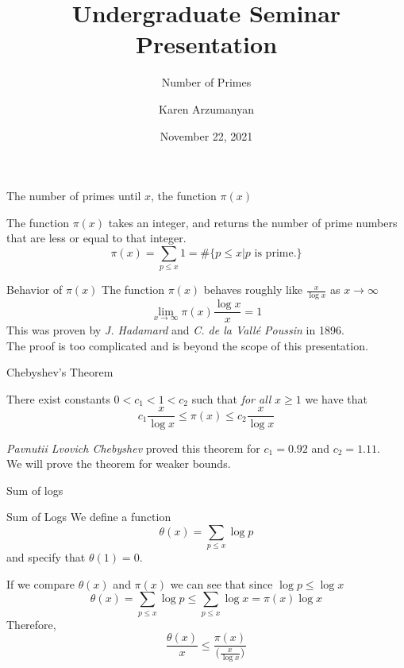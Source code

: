\documentclass[18pt]{beamer}
\title{Undergraduate Seminar Presentation}
\subtitle{Number of Primes}
\author{Karen Arzumanyan}
\date{November 22, 2021}
\begin{document}

\begin{frame}
    \maketitle
\end{frame}

\begin{frame}{The number of primes until $x$, the function $\pi(x)$}
    \begin{definition}
        The function $\pi(x)$ takes an integer, and returns the number of prime numbers that are less or equal to that integer.
        \pause{}
        \[\pi(x) = \sum\limits_{p \leq x} 1 = \#\{p \leq  x | p \text{ is prime.}\}\]
    \end{definition}
\end{frame}

\begin{frame}{Behavior of $\pi(x)$}
   The function $\pi(x)$ behaves roughly like $\frac{x}{\log{x}}$ as $x \rightarrow \infty$
   \pause{}
   \[\lim\limits_{x \rightarrow \infty} \pi(x)\frac{\log{x}}{x} = 1\]
   \pause{}
   This was proven by \textit{J. Hadamard} and \textit{C. de la Vallé Poussin} in 1896.\\
   \pause{}
   The proof is too complicated and is beyond the scope of this presentation.
\end{frame}

\begin{frame}{Chebyshev's Theorem}
    \begin{theorem}[Chebyshev]
    There exist constants $0 < c_1 < 1 < c_2$ such that \textit{for all} $x \geq 1$ we have that
    \[c_1 \frac{x}{\log{x}} \leq \pi(x) \leq c_2 \frac{x}{\log{x}}\]
    \end{theorem}
    \vspace{1em}
    \pause{}
    \textit{Pavnutii Lvovich Chebyshev} proved this theorem for $c_1 = 0.92$ and $c_2 = 1.11$.\\
    \pause{}
    \vspace{1em}
    We will prove the theorem for weaker bounds.
\end{frame}

\begin{frame}{Sum of logs}
   \begin{block}{Sum of Logs}
       We define a function \[\theta(x) = \sum\limits_{p \leq x} \log{p} \]
       and specify that $\theta(1) = 0$.
   \end{block} 
   \pause{}
   \vspace{0.5em}
   If we compare $\theta(x)$ and $\pi(x)$ we can see that since $\log{p} \leq \log{x}$
   \[\theta(x) = \sum\limits_{p \leq x} \log{p} \leq \sum \limits_{p \leq x} \log{x} = \pi(x) \log{x}\]
   \pause{}
   Therefore,
   \[\frac{\theta(x)}{x} \leq \frac{\pi(x)}{\big(\frac{x}{\log{x}}\big)}\]
\end{frame}
\end{document}
